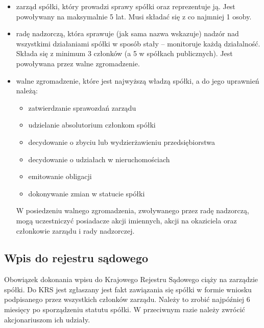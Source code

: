 \documentclass[11pt]{article}
\begin{document}
	\begin{itemize}
	
	\item zarząd spółki, który prowadzi sprawy spółki oraz reprezentuje ją. Jest powoływany na maksymalnie 5 lat. Musi składać się z co najmniej 1 osoby.
	\item radę nadzorczą, która sprawuje (jak sama nazwa wskazuje) nadzór nad wszystkimi działaniami spółki w sposób stały – monitoruje każdą działalność. Składa się z minimum 3 członków (a 5 w spółkach publicznych). Jest powoływana przez walne zgromadzenie.
	\item walne zgromadzenie, które jest najwyższą władzą spółki, a do jego uprawnień należą:
	\begin{itemize}

	\item zatwierdzanie sprawozdań zarządu
	\item udzielanie absolutorium członkom spółki
	\item decydowanie o zbyciu lub wydzierżawieniu przedsiębiorstwa
	\item decydowanie o udziałach w nieruchomościach
	\item emitowanie obligacji
	\item dokonywanie zmian w statucie spółki
	
	\end{itemize}
	
	W posiedzeniu walnego zgromadzenia, zwoływanego przez radę nadzorczą, mogą uczestniczyć posiadacze akcji imiennych, akcji na okaziciela oraz członkowie zarządu i rady nadzorczej.
	
	\end{itemize}
	
	\subsection{Wpis do rejestru sądowego}
	
	Obowiązek dokonania wpisu do Krajowego Rejestru Sądowego ciąży na zarządzie spółki. Do KRS jest zgłaszany jest fakt zawiązania się spółki w formie wniosku podpisanego przez wszystkich członków zarządu. Należy to zrobić najpóźniej 6 miesięcy po sporządzeniu statutu spółki. W przeciwnym razie należy zwrócić akcjonariuszom ich udziały.
	
\end{document}
